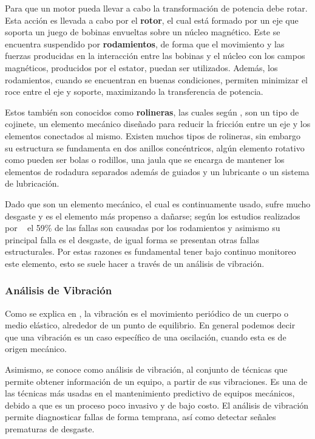 Para que un motor pueda llevar a cabo la transformación de potencia debe rotar.
Esta acción es llevada a cabo por el \textbf{rotor}, el cual está formado por un
eje que soporta un juego de bobinas envueltas sobre un núcleo magnético. Este
se encuentra suspendido por \textbf{rodamientos}, de forma que el movimiento y
las fuerzas producidas en la interacción entre las bobinas y el núcleo con los
campos magnéticos, producidos por el estator, puedan ser utilizados. Además,
los rodamientos, cuando se encuentran en buenas condiciones, permiten minimizar
el roce entre el eje y soporte, maximizando la transferencia de potencia.

Estos también son conocidos como \textbf{rolineras}, las cuales según
\textcite{rodamiento},  son un tipo de cojinete,
un elemento mecánico diseñado para reducir la fricción entre un eje y los
elementos conectados al mismo. Existen muchos tipos de rolineras, sin embargo
su estructura se fundamenta en dos anillos concéntricos, algún elemento rotativo
como pueden ser bolas o rodillos, una jaula que se encarga de mantener los
elementos de rodadura separados además de guiados y un lubricante o un sistema
de lubricación.

Dado que son un elemento mecánico, el cual es continuamente usado, sufre mucho
desgaste y es el elemento más propenso a dañarse; según los estudios realizados
por ~\textcite{Kammermann} el 59\% de las fallas son causadas por los rodamientos
y asimismo su principal falla es el desgaste, de igual forma se presentan
otras fallas estructurales. Por estas razones es fundamental tener bajo continuo
monitoreo este elemento, esto se suele hacer a través de un análisis de vibración.


\subsubsection{Análisis de Vibración}

Como se explica en \textcite{wiki:Vibration}, la vibración es el  movimiento
periódico de un cuerpo o medio
elástico, alrededor de un punto de equilibrio. En general podemos decir que una
vibración es un caso específico de una oscilación, cuando esta es de origen
mecánico.

Asimismo, se conoce como análisis de vibración, al conjunto de técnicas que permite
obtener información de un equipo, a partir de sus vibraciones. Es una de las
técnicas más usadas en el mantenimiento predictivo de equipos mecánicos, debido
a que es un proceso poco invasivo y de bajo costo. El análisis de vibración
permite diagnosticar fallas de forma temprana, así como detectar señales
prematuras de desgaste.

